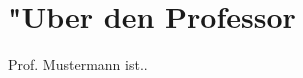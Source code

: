 \documentclass[emulatestandardclasses]{scrartcl}
\begin{document}
\begin{description}[leftmargin=!,labelwidth=\widthof{\bfseries Transzendentalphilosophie bei Kant}]
  \item[] 
\end{description}



\newpage
\section{"Uber den Professor}
Prof. Mustermann ist..


\end{document}
